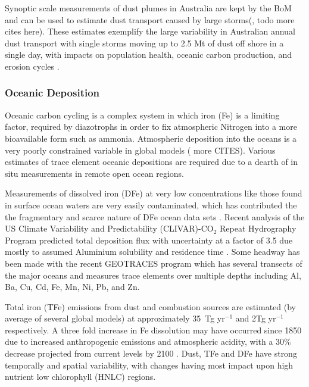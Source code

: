 Synoptic scale measurements of dust plumes in Australia are kept by the BoM and can be used to estimate dust transport caused by large storms(\cite{Leys_2011}, todo more cites here). 
These estimates exemplify the large variability in Australian annual dust transport with single storms moving up to 2.5 Mt of dust off shore in a single day, with impacts on population health, oceanic carbon production, and erosion cycles \cite{Leys_2011,Shao_2007}.

\subsubsection{Oceanic Deposition}
Oceanic carbon cycling is a complex system in which iron (Fe) is a limiting factor, required by diazotrophs in order to fix atmospheric Nitrogen into a more bioavailable form such as ammonia.
Atmospheric deposition into the oceans is a very poorly constrained variable in global models (\cite{Grand_2015} more CITES).
Various estimates of trace element oceanic depositions are required due to a dearth of in situ measurements in remote open ocean regions.

Measurements of dissolved iron (DFe) at very low concentrations like those found in surface ocean waters are very easily contaminated, which has contributed the the fragmentary and scarce nature of DFe ocean data sets \cite{Rijkenberg_2014}.
Recent analysis of the US Climate Variability and Predictability (CLIVAR)-CO$_{2}$ Repeat Hydrography Program predicted total deposition flux with uncertainty at a factor of 3.5 due mostly to assumed Aluminium solubility and residence time \cite{Grand_2015}.
Some headway has been made with the recent GEOTRACES program which has several transects of the major oceans and measures trace elements over multiple depths including Al, Ba, Cu, Cd, Fe, Mn, Ni, Pb, and Zn.
  
Total iron (TFe) emissions from dust and combustion sources are estimated (by average of several global models) at approximately 35~Tg yr$^{-1}$ and 2Tg yr$^{-1}$ respectively. A three fold increase in Fe dissolution may have occurred since 1850 due to increased anthropogenic emissions and atmospheric acidity, with a 30\% decrease projected from current levels by 2100 \cite{Myriokefalitakis_2015}.
Dust, TFe and DFe have strong temporally and spatial variability, with changes having most impact upon high nutrient low chlorophyll (HNLC) regions.

  
  
  